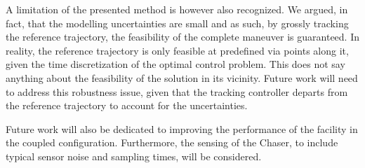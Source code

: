 A limitation of the presented method is however also recognized. We argued, in fact, that the modelling uncertainties are small and as such, by grossly tracking the reference trajectory, the feasibility of the complete maneuver is guaranteed. In reality, the reference trajectory is only feasible at predefined via points along it, given the time discretization of the optimal control problem. This does not say anything about the feasibility of the solution in its vicinity. Future work will need to address this robustness issue, given that the tracking controller departs from the reference trajectory to account for the uncertainties. 

Future work will also be dedicated to improving the performance of the facility in the coupled configuration. Furthermore, the sensing of the Chaser, to include typical sensor noise and sampling times, will be considered.
%
%
%
%
%
%
